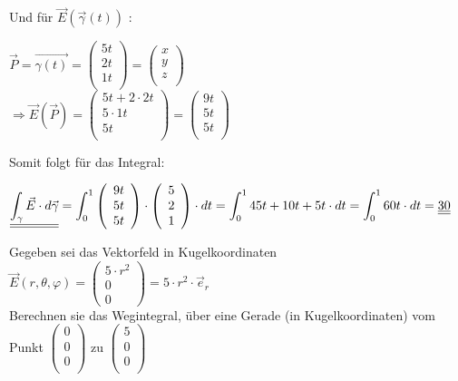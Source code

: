 Und für $\vec{E}(\vec{\gamma}(t))$ :
\begin{center}
	$\vec{P} = \vec{\gamma(t)} =  \left(\begin{array}{c} 5t \\ 2t\\ 1t\\ \end{array}\right) = \left(\begin{array}{c} x \\ y\\ z\\\end{array}\right)$ \\
	$\Rightarrow \vec{E}(\vec{P}) =  \left(\begin{array}{c} 5t + 2\cdot2t \\ 5\cdot 1t\\ 5t\\ \end{array}\right) =  \left(\begin{array}{c} 9t \\ 5t\\ 5t\\ \end{array}\right) $ \
\end{center}
Somit folgt für das Integral:
\begin{center}
	$\displaystyle \underline{\underline{\int_\gamma \vec{E}\cdot d\vec{\gamma}}} =  \int_0^1 \left(\begin{array}{c} 9t \\ 5t\\ 5t\\ \end{array}\right)  \cdot \left(\begin{array}{c} 5 \\ 2\\ 1\\ \end{array}\right)\cdot dt = \int_0^1 45t + 10t + 5t \cdot dt = \int_0^1 60t \cdot dt = \underline{\underline{30}} $
\end{center}

\iend

\newpage

\beginbsp
Gegeben sei das Vektorfeld in Kugelkoordinaten $\vec{E}(r,\theta,\varphi) =  \left(\begin{array}{c} 5 \cdot r^2 \\ 0 \\ 0 \end{array}\right) = 5 \cdot r^2\cdot \vec{e}_r$ \\
Berechnen sie das Wegintegral, über eine Gerade (in Kugelkoordinaten) vom Punkt $\left(\begin{array}{c} 0 \\ 0\\ 0\\ \end{array}\right)$ zu $\left(\begin{array}{c} 5 \\ 0\\ 0 \\ \end{array}\right)$

